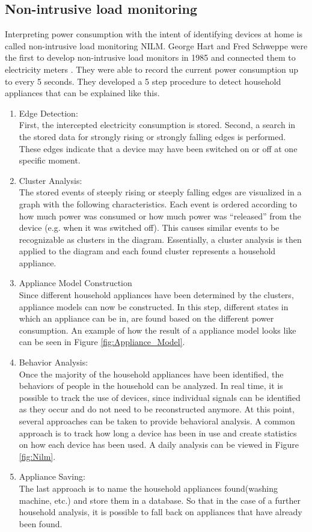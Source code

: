 \subsection{Non-intrusive load monitoring} 
\label{subsec:NILM_sec}
Interpreting power consumption with the intent of identifying devices at home is called non-intrusive load monitoring \gls{NILM}. George Hart and Fred Schweppe were the first to develop non-intrusive load monitors in 1985 and connected them to electricity meters \cite{hart1989residential}. They were able to record the current power consumption up to every 5 seconds. They developed a 5 step procedure to detect household appliances that can be explained like this.
\begin{enumerate}
\item Edge Detection:\\
First, the intercepted electricity consumption is stored. Second, a search in the stored data for strongly rising or strongly falling edges is performed. These edges indicate that a device may have been switched on or off at one specific moment.
\item Cluster Analysis:\\ 
The stored events of steeply rising or steeply falling edges are visualized in a graph with the following characteristics. Each event is ordered according to how much power was consumed or how much power was 	``released'' from the device (e.g. when it was switched off). This causes similar events to be recognizable as clusters in the diagram.
Essentially, a cluster analysis is then applied to the diagram and each found cluster represents a household appliance.
\item Appliance Model Construction\\
Since different household appliances have been determined by the clusters, appliance models can now be constructed. In this step, different states in which an appliance can be in, are found based on the different power consumption. An example of how the result of a appliance model looks like can be seen in Figure \ref{fig:Appliance_Model}.
\item Behavior Analysis:\\
Once the majority of the household appliances have been identified, the behaviors of people in the household can be analyzed. In real time, it is possible to track the use of devices, since individual signals can be identified as they occur and do not need to be reconstructed anymore.
At this point, several approaches can be taken to provide behavioral analysis. A common approach is to track how long a device has been in use and create statistics on how each device has been used. A daily analysis can be viewed in Figure \ref{fig:Nilm}.
\item Appliance Saving:\\
The last approach is to name the household appliances found(washing machine, etc.) and store them in a database. So that in the case of a further household analysis, it is possible to fall back on appliances that have already been found.
\end{enumerate}

